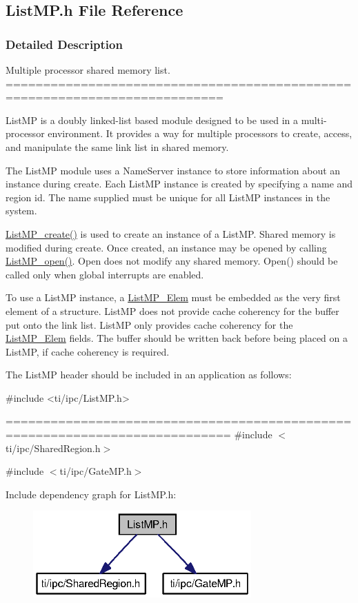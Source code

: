 \subsection{ListMP.h File Reference}
\label{_list_m_p_8h}


\subsubsection{Detailed Description}
Multiple processor shared memory list. ===========================================================================

ListMP is a doubly linked-\/list based module designed to be used in a multi-\/processor environment. It provides a way for multiple processors to create, access, and manipulate the same link list in shared memory.

The ListMP module uses a NameServer instance to store information about an instance during create. Each ListMP instance is created by specifying a name and region id. The name supplied must be unique for all ListMP instances in the system.

\hyperlink{_list_m_p_8h_a71fdd7f30d377065fb70dd095a186d3e}{ListMP\_\-create()} is used to create an instance of a ListMP. Shared memory is modified during create. Once created, an instance may be opened by calling \hyperlink{_list_m_p_8h_aeae2eea832b0f2f8cf45ea297bb1c7d0}{ListMP\_\-open()}. Open does not modify any shared memory. Open() should be called only when global interrupts are enabled.

To use a ListMP instance, a \hyperlink{struct_list_m_p___elem}{ListMP\_\-Elem} must be embedded as the very first element of a structure. ListMP does not provide cache coherency for the buffer put onto the link list. ListMP only provides cache coherency for the \hyperlink{struct_list_m_p___elem}{ListMP\_\-Elem} fields. The buffer should be written back before being placed on a ListMP, if cache coherency is required.

The ListMP header should be included in an application as follows: 
\begin{DoxyCode}
  #include <ti/ipc/ListMP.h>
\end{DoxyCode}


============================================================================ {\ttfamily \#include $<$ti/ipc/SharedRegion.h$>$}\par
{\ttfamily \#include $<$ti/ipc/GateMP.h$>$}\par
Include dependency graph for ListMP.h:
\nopagebreak
\begin{figure}[H]
\begin{center}
\leavevmode
\includegraphics[width=237pt]{_list_m_p_8h__incl}
\end{center}
\end{figure}
